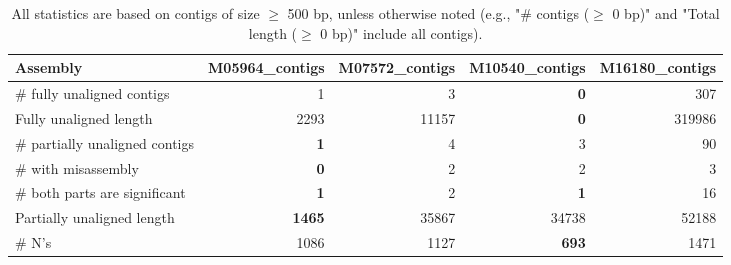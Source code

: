 \documentclass[12pt,a4paper]{article}
\begin{document}
\begin{table}[ht]
\begin{center}
\caption{All statistics are based on contigs of size $\geq$ 500 bp, unless otherwise noted (e.g., "\# contigs ($\geq$ 0 bp)" and "Total length ($\geq$ 0 bp)" include all contigs).}
\begin{tabular}{|l*{4}{|r}|}
\hline
Assembly & M05964\_contigs & M07572\_contigs & M10540\_contigs & M16180\_contigs \\ \hline
\# fully unaligned contigs & 1 & 3 & {\bf 0} & 307 \\ \hline
Fully unaligned length & 2293 & 11157 & {\bf 0} & 319986 \\ \hline
\# partially unaligned contigs & {\bf 1} & 4 & 3 & 90 \\ \hline
\hspace{5mm}\# with misassembly & {\bf 0} & 2 & 2 & 3 \\ \hline
\hspace{5mm}\# both parts are significant & {\bf 1} & 2 & {\bf 1} & 16 \\ \hline
Partially unaligned length & {\bf 1465} & 35867 & 34738 & 52188 \\ \hline
\# N's & 1086 & 1127 & {\bf 693} & 1471 \\ \hline
\end{tabular}
\end{center}
\end{table}
\end{document}
